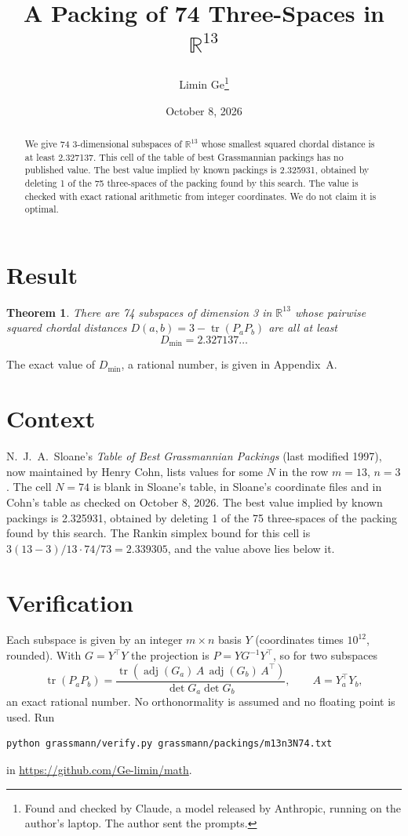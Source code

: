 \documentclass[11pt,a4paper]{article}
\title{A Packing of 74 Three-Spaces in $\mathbb{R}^{13}$}
\author{Limin Ge\thanks{Found and checked by Claude, a model released by Anthropic, running on the author's laptop. The author sent the prompts.}}
\date{October 8, 2026}
\newtheorem*{theorem}{Theorem}
\begin{document}
\maketitle
\begin{abstract}
We give 74 3-dimensional subspaces of $\mathbb{R}^{13}$ whose smallest squared chordal distance is at least 2.327137. This cell of the table of best Grassmannian packings has no published value. The best value implied by known packings is 2.325931, obtained by deleting 1 of the 75 three-spaces of the packing found by this search. The value is checked with exact rational arithmetic from integer coordinates. We do not claim it is optimal.
\end{abstract}

\section{Result}
\begin{theorem}
There are 74 subspaces of dimension 3 in $\mathbb{R}^{13}$ whose pairwise squared chordal distances $D(a,b) = 3 - \operatorname{tr}(P_aP_b)$ are all at least
\[ D_{\min} = 2.327137\ldots \]
\end{theorem}
The exact value of $D_{\min}$, a rational number, is given in Appendix~A.


\section{Context}
N.~J.~A.~Sloane's \emph{Table of Best Grassmannian Packings} (last modified 1997), now maintained by Henry Cohn, lists values for some $N$ in the row $m=13$, $n=3$. The cell $N=74$ is blank in Sloane's table, in Sloane's coordinate files and in Cohn's table as checked on October 8, 2026. The best value implied by known packings is 2.325931, obtained by deleting 1 of the 75 three-spaces of the packing found by this search. The Rankin simplex bound for this cell is $3(13-3)/13\cdot 74/73 = 2.339305$, and the value above lies below it.


\section{Verification}
Each subspace is given by an integer $m\times n$ basis $Y$ (coordinates times $10^{12}$, rounded). With $G=Y^\top Y$ the projection is $P=YG^{-1}Y^\top$, so for two subspaces
\[ \operatorname{tr}(P_aP_b)=\frac{\operatorname{tr}(\operatorname{adj}(G_a)\,A\,\operatorname{adj}(G_b)\,A^\top)}{\det G_a\det G_b},\qquad A=Y_a^\top Y_b, \]
an exact rational number. No orthonormality is assumed and no floating point is used. Run
\begin{verbatim}
python grassmann/verify.py grassmann/packings/m13n3N74.txt
\end{verbatim}
in \url{https://github.com/Ge-limin/math}.
\end{document}
